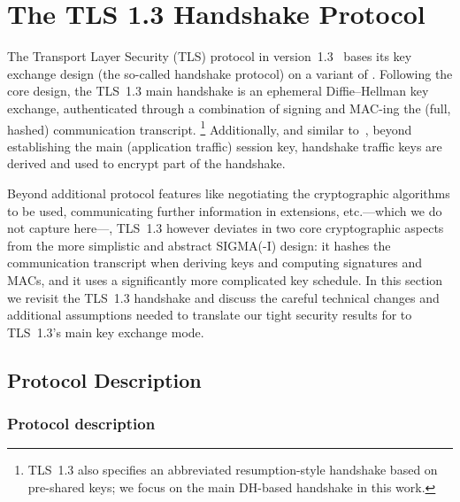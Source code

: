 \section{The TLS 1.3 Handshake Protocol}
\label{sec:tls}

The Transport Layer Security (TLS) protocol in version~1.3~\cite{rfc8446} bases its key exchange design (the so-called handshake protocol) on a variant of \SIGMAI.
Following the core \SIGMA design, the TLS~1.3 main handshake is an ephemeral Diffie--Hellman key exchange, authenticated through a combination of signing and MAC-ing the (full, hashed) communication transcript.%
\footnote{TLS~1.3 also specifies an abbreviated resumption-style handshake based on pre-shared keys; we focus on the main DH-based handshake in this work.}
Additionally, and similar to~\SIGMAI, beyond establishing the main (application traffic) session key, handshake traffic keys are derived and used to encrypt part of the handshake.

Beyond additional protocol features like negotiating the cryptographic algorithms to be used, communicating further information in extensions, etc.---which we do not capture here---, TLS~1.3 however deviates in two core cryptographic aspects from the more simplistic and abstract SIGMA(-I) design:
it hashes the communication transcript when deriving keys and computing signatures and MACs,
and it uses a significantly more complicated key schedule.
In this section we revisit the TLS~1.3 handshake and discuss the careful technical changes and additional assumptions needed to translate our tight security results for \SIGMAI to TLS~1.3's main key exchange mode.


\iffull
\subsection{Protocol Description}
\else
\subsubsection*{Protocol description\lncsdot}
\fi

